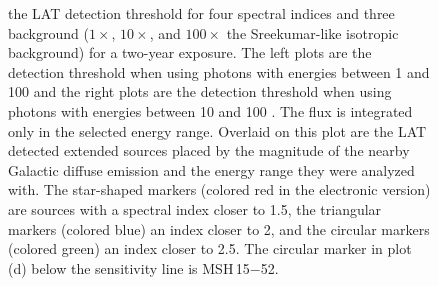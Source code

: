 \documentclass[12pt,preprint]{aastex}
\newif\ifcolorfigure
\newcommand{\gev}{\text{GeV}\xspace}
\begin{document}
\clearpage
\begin{figure}
    \ifcolorfigure
    \plotone{mc_plots/all_sensitivity_color.eps}
    \else
    \fi
    \caption{the LAT detection threshold for four spectral indices
    and three background ($1\times$, $10\times$, and $100\times$ the
    Sreekumar-like isotropic background) for a two-year exposure. The
    left plots are the detection threshold when using 
    photons with energies between
    1 \gev and 100 \gev
    and the right plots are the detection threshold when using
    photons with energies between
    10 \gev and 100 \gev.  The flux is integrated only in the
    selected energy range.  Overlaid on this plot are the LAT detected
    extended sources placed by the magnitude of the nearby Galactic
    diffuse emission and the energy range they were analyzed with.
    The star-shaped markers (colored red in the electronic version)
    are sources with a spectral index closer to 1.5, the triangular
    markers (colored blue) an index closer to 2, and the circular markers
    (colored green) an index closer to 2.5.  The circular marker in plot
    (d) below the sensitivity line is MSH\,15$-$52.
    }\label{all_sensitivity} 
  \end{figure}
\end{document}
